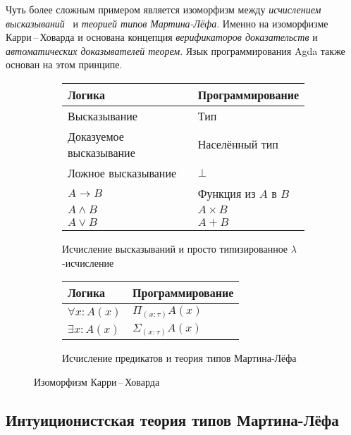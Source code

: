 Чуть более сложным примером является изоморфизм между
\emph{исчислением высказываний}~\cite{шень2,curryhoward} и
\emph{теорией типов Мартина-Лёфа}. Именно на изоморфизме
Карри\,--\,Ховарда и основана концепция \emph{верификаторов
  доказательств} и \emph{автоматических доказывателей теорем}. Язык
программирования Agda также основан на этом принципе.

\begin{figure}
  \centering
  \begin{subfigure}[b]{0.55\textwidth}
    \centering
    \begin{tabular}{|l|l|}
      \hline
      \textbf{Логика} & \textbf{Программирование} \\
      \hline
      Высказывание & Тип \\
      \hline
      Доказуемое высказывание & Населённый тип \\
      \hline
      Ложное высказывание & $\bot$ \\
      \hline
      $A \to B$ & Функция из $A$ в $B$ \\
      \hline
      $A \wedge B$ & $A \times B$ \\
      \hline
      $A \vee B$ & $A + B$ \\
      \hline
    \end{tabular}
    \caption{Исчисление высказываний и просто типизированное
      $\lambda$-исчисление}
    \label{fig:curry-howard-int}
  \end{subfigure}
  \begin{subfigure}[b]{0.4\textwidth}
    \centering
    \begin{tabular}{|l|l|}
      \hline
      \textbf{Логика} & \textbf{Программирование} \\
      \hline
      $\forall x : A(x)$ & $\Pi_{(x:\tau)} A(x)$ \\
      \hline
      $\exists x : A(x)$ & $\Sigma_{(x:\tau)} A(x)$\\
      \hline
    \end{tabular}
    \caption{Исчисление предикатов и теория типов Мартина-Лёфа}
    \label{fig:curry-howard-mltt}
  \end{subfigure}
  \caption{Изоморфизм Карри\,--\,Ховарда}
\end{figure}

\subsection{Интуиционистская теория типов Мартина-Лёфа}

